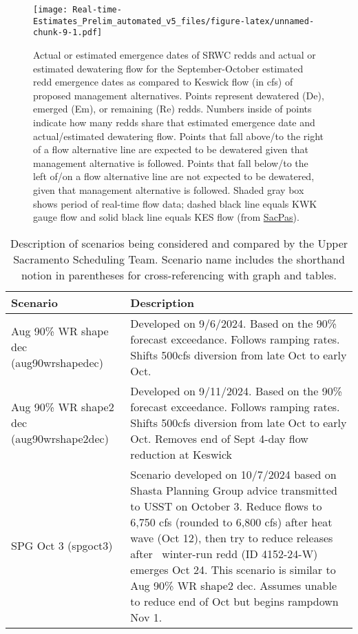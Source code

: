\documentclass[
]{article}
\begin{document}
\begin{figure}
\centering
\texttt{[image: Real-time-Estimates\_Prelim\_automated\_v5\_files/figure-latex/unnamed-chunk-9-1.pdf]}
\caption{Actual or estimated emergence dates of SRWC redds and actual or
estimated dewatering flow for the September-October estimated redd
emergence dates as compared to Keswick flow (in cfs) of proposed
management alternatives. Points represent dewatered (De), emerged (Em),
or remaining (Re) redds. Numbers inside of points indicate how many
redds share that estimated emergence date and actual/estimated
dewatering flow. Points that fall above/to the right of a flow
alternative line are expected to be dewatered given that management
alternative is followed. Points that fall below/to the left of/on a flow
alternative line are not expected to be dewatered, given that management
alternative is followed. Shaded gray box shows period of real-time flow
data; dashed black line equals KWK gauge flow and solid black line
equals KES flow (from
\href{https://www.cbr.washington.edu/sacramento/data/query_river_table.html}{SacPas}).}
\end{figure}

\begin{table}

\caption{\label{tab:unnamed-chunk-10}Description of scenarios being considered and compared by the Upper Sacramento Scheduling Team. Scenario name includes the shorthand notion in parentheses for cross-referencing with graph and tables.}
\centering
\begin{tabular}[t]{>{\raggedright\arraybackslash}p{3cm}|>{\raggedright\arraybackslash}p{13cm}}
\hline
Scenario & Description\\
\hline
Aug 90\% WR shape dec (aug90wrshapedec) & Developed on 9/6/2024. Based on the 90\% forecast exceedance. Follows ramping rates.  Shifts 500cfs diversion from late Oct to early Oct.\\
\hline
Aug 90\% WR shape2 dec (aug90wrshape2dec) & Developed on 9/11/2024. Based on the 90\% forecast exceedance. Follows ramping rates.  Shifts 500cfs diversion from late Oct to early Oct.  Removes end of Sept 4-day flow reduction at Keswick\\
\hline
SPG Oct 3 (spgoct3) & Scenario developed on 10/7/2024 based on Shasta Planning Group advice transmitted to USST on October 3. Reduce flows to 6,750 cfs (rounded to 6,800 cfs) after heat wave (Oct 12), then try to reduce releases after  winter-run redd (ID 4152-24-W) emerges Oct 24. This scenario is similar to Aug 90\% WR shape2 dec.  Assumes unable to reduce end of Oct but begins rampdown Nov 1.\\
\hline
\end{tabular}
\end{table}
\end{document}
